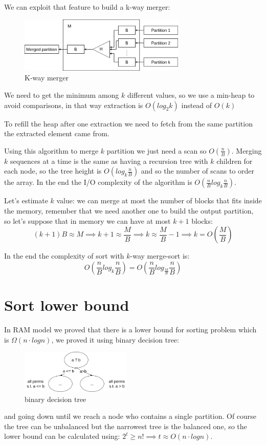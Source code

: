 We can exploit that feature to build a k-way merger:
\begin{figure}[H]
    \centering
    \includegraphics[width=300px]{images/2_Sorting/k-way_merger.png}
    \caption{K-way merger}
\end{figure}
We need to get the minimum among $k$ different values, so we use a min-heap to avoid comparisons, in that way extraction is $O(log_2 k)$ instead of $O(k)$

To refill the heap after one extraction we need to fetch from the same partition the extracted element came from.

Using this algorithm to merge $k$ partition we just need a scan so $O(\frac{n}{B})$.
Merging $k$ sequences at a time is the same as having a recursion tree with $k$ children for each node, so the tree height is $O(log_k \frac{n}{B})$ and so the number of scans to order the array.
In the end the I/O complexity of the algorithm is $O\left( \frac{n}{B}log_k \frac{n}{B} \right)$.

Let's estimate $k$ value: we can merge at most the number of blocks that fits inside the memory, remember that we need another one to build the output partition, so let's suppose that in memory we can have at most $k+1$ blocks:
$$
    (k+1)B \approx M \implies k+1 \approx \frac{M}{B} \implies k \approx \frac{M}{B}-1 \implies k = O \left( \frac{M}{B} \right)
$$

In the end the complexity of sort with $k$-way merge-sort is:
$$
    O\left( \frac{n}{B} log_k \frac{n}{B} \right) = O\left( \frac{n}{B} log_{\frac{M}{B}} \frac{n}{B} \right)
$$

\section{Sort lower bound}
In RAM model we proved that there is a lower bound for sorting problem which is $\Omega(n \cdot log n)$, we proved it using binary decision tree:
\begin{figure}[H]
    \centering
    \includegraphics[width=200px]{images/2_Sorting/decision_tree.png}
    \caption{binary decision tree}
\end{figure}
and going down until we reach a node who contains a single partition.
Of course the tree can be unbalanced but the narrowest tree is the balanced one, so the lower bound can be calculated using: $2^t \geq n! \implies t \approx O(n \cdot log n)$.


